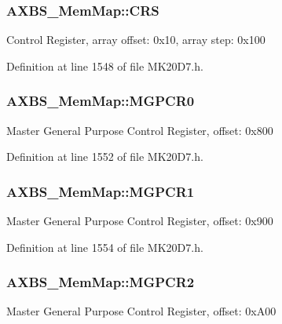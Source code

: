 \subsubsection[{\texorpdfstring{C\+RS}{CRS}}]{ A\+X\+B\+S\+\_\+\+Mem\+Map\+::\+C\+RS}\hypertarget{struct_a_x_b_s___mem_map_af4605bf03bb478b8076fffe21d52671f}{}\label{struct_a_x_b_s___mem_map_af4605bf03bb478b8076fffe21d52671f}
Control Register, array offset\+: 0x10, array step\+: 0x100 

Definition at line 1548 of file M\+K20\+D7.\+h.

\subsubsection[{\texorpdfstring{M\+G\+P\+C\+R0}{MGPCR0}}]{ A\+X\+B\+S\+\_\+\+Mem\+Map\+::\+M\+G\+P\+C\+R0}\hypertarget{struct_a_x_b_s___mem_map_a8e6ee199b9eb723478215926f9f3b6fe}{}\label{struct_a_x_b_s___mem_map_a8e6ee199b9eb723478215926f9f3b6fe}
Master General Purpose Control Register, offset\+: 0x800 

Definition at line 1552 of file M\+K20\+D7.\+h.

\subsubsection[{\texorpdfstring{M\+G\+P\+C\+R1}{MGPCR1}}]{ A\+X\+B\+S\+\_\+\+Mem\+Map\+::\+M\+G\+P\+C\+R1}\hypertarget{struct_a_x_b_s___mem_map_a952d7f281eaf5fba221d0f1d3292f01b}{}\label{struct_a_x_b_s___mem_map_a952d7f281eaf5fba221d0f1d3292f01b}
Master General Purpose Control Register, offset\+: 0x900 

Definition at line 1554 of file M\+K20\+D7.\+h.

\subsubsection[{\texorpdfstring{M\+G\+P\+C\+R2}{MGPCR2}}]{ A\+X\+B\+S\+\_\+\+Mem\+Map\+::\+M\+G\+P\+C\+R2}\hypertarget{struct_a_x_b_s___mem_map_a4bf70415762da6b4a4ef334878593d2f}{}\label{struct_a_x_b_s___mem_map_a4bf70415762da6b4a4ef334878593d2f}
Master General Purpose Control Register, offset\+: 0x\+A00 

